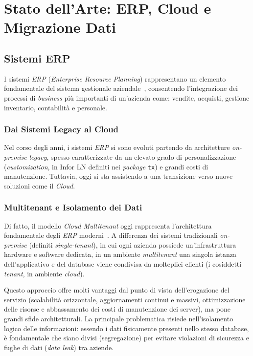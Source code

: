 ﻿\chapter{Stato dell'Arte: ERP, Cloud e Migrazione Dati}\label{ch:stato-attuale}


\section{Sistemi ERP}\label{sec:sistemi-erp}
I sistemi \textit{ERP} (\textit{Enterprise Resource Planning}) rappresentano un elemento fondamentale del sistema gestionale aziendale~\cite{erpMigration},
consentendo l'integrazione dei processi di \textit{business} più importanti di un'azienda come: vendite, acquisti, gestione inventario, contabilità e personale.

\subsection{Dai Sistemi Legacy al Cloud}\label{subsec:evoluzione-dei-sistemi-legacy-al-cloud}
Nel corso degli anni, i sistemi \textit{ERP} si sono evoluti partendo da architetture \textit{on-premise} \textit{legacy}, spesso caratterizzate da un elevato
grado di personalizzazione (\textit{customization}, in Infor LN definiti nei \textit{package} \texttt{tx}) e grandi costi di manutenzione.
Tuttavia, oggi si sta assistendo a una transizione verso nuove soluzioni come il \textit{Cloud}.

\subsection{Multitenant e Isolamento dei Dati}\label{subsec:architetture-multitenant-e-segregazione-dei-dati}
Di fatto, il modello \textit{Cloud Multitenant} oggi rappresenta l'architettura fondamentale degli \textit{ERP} moderni~\cite{multitenantCloud}.
A differenza dei sistemi tradizionali \textit{on-premise} (definiti \textit{single-tenant}), in cui ogni azienda possiede un'infrastruttura hardware e software
dedicata, in un ambiente \textit{multitenant} una singola istanza dell'applicativo e del database viene condivisa da molteplici clienti (i cosiddetti \textit{tenant}, in ambiente \textit{cloud}).

Questo approccio offre molti vantaggi dal punto di vista dell'erogazione del servizio (scalabilità orizzontale, aggiornamenti continui e massivi,
ottimizzazione delle risorse e abbassamento dei costi di manutenzione dei server), ma pone grandi sfide architetturali.
La principale problematica risiede nell'isolamento logico delle informazioni: essendo i dati fisicamente presenti nello
stesso database, è fondamentale che siano divisi (segregazione) per evitare violazioni di sicurezza e
fughe di dati (\textit{data leak}) tra aziende.

